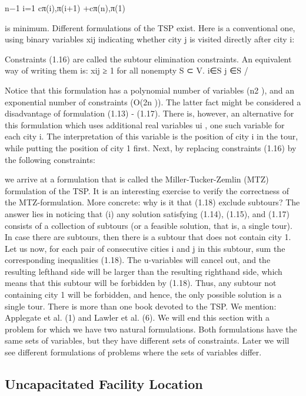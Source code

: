 \documentclass[titlepage]{book}
\begin{document}
n−1
i=1 cπ(i),π(i+1) +cπ(n),π(1)

is minimum.
Different formulations of the TSP exist. Here is a conventional one, using binary variables xij indicating
whether city j is visited directly after city i:


Constraints (1.16) are called the subtour elimination constraints. An equivalent way of writing them is:
xij ≥ 1 for all nonempty S ⊂ V.
i∈S j ∈S
/

Notice that this formulation has a polynomial number of variables (n2 ), and an exponential number of
constraints (O(2n )). The latter fact might be considered a disadvantage of formulation (1.13) - (1.17).
There is, however, an alternative for this formulation which uses additional real variables ui , one such
variable for each city i. The interpretation of this variable is the position of city i in the tour, while
putting the position of city 1 first. Next, by replacing constraints (1.16) by the following constraints:


we arrive at a formulation that is called the Miller-Tucker-Zemlin (MTZ) formulation of the TSP. It is
an interesting exercise to verify the correctness of the MTZ-formulation. More concrete: why is it that
(1.18) exclude subtours? The answer lies in noticing that (i) any solution satisfying (1.14), (1.15), and
(1.17) consists of a collection of subtours (or a feasible solution, that is, a single tour). In case there are
subtours, then there is a subtour that does not contain city 1. Let us now, for each pair of consecutive
cities i and j in this subtour, sum the corresponding inequalities (1.18). The u-variables will cancel out,
and the resulting lefthand side will be larger than the resulting righthand side, which means that this
subtour will be forbidden by (1.18). Thus, any subtour not containing city 1 will be forbidden, and hence,
the only possible solution is a single tour.
There is more than one book devoted to the TSP. We mention: Applegate et al. (1) and Lawler et al. (6).
We will end this section with a problem for which we have two natural formulations. Both formulations
have the same sets of variables, but they have different sets of constraints. Later we will see different
formulations of problems where the sets of variables differ.

\subsection{Uncapacitated Facility Location}
\end{document}
